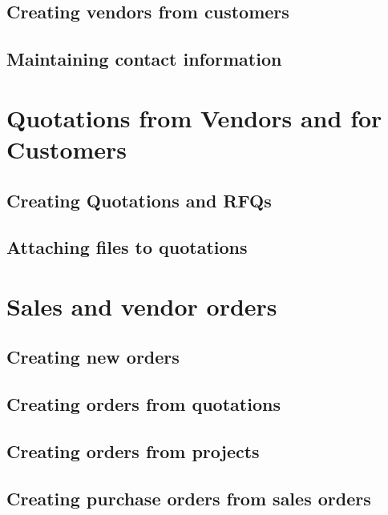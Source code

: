 \section{Creating vendors from customers}


\section{Maintaining contact information}


\chapter{Quotations from Vendors and for Customers}

\section{Creating Quotations and RFQs}

\section{Attaching files to quotations}
\label{sec:FileAttachments}


\chapter{Sales and vendor orders}
\label{cha:OrderManagement}

\section{Creating new orders}

\section{Creating orders from quotations}

\section{Creating orders from projects}

\section{Creating purchase orders from sales orders}

